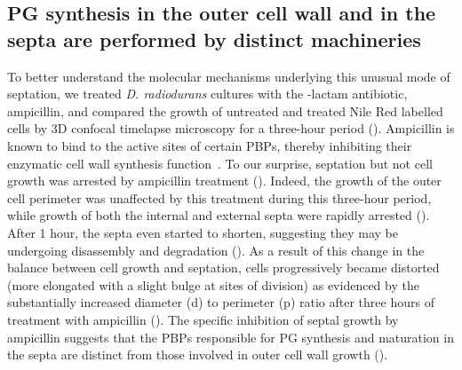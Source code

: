 \FloatBarrier

\subsection{PG synthesis in the outer cell wall and in the septa are performed by distinct machineries}

To better understand the molecular mechanisms underlying this unusual mode of septation, we treated \textit{D. radiodurans} cultures with the \beta-lactam antibiotic, ampicillin, and compared the growth of untreated and treated Nile Red labelled cells by 3D confocal timelapse microscopy for a three-hour period ().
Ampicillin is known to bind to the active sites of certain PBPs, thereby inhibiting their enzymatic cell wall synthesis function~\cite{sauvageGlycosyltransferasesTranspeptidasesPenicillinBinding2016}.
To our surprise, septation but not cell growth was arrested by ampicillin treatment ().
Indeed, the growth of the outer cell perimeter was unaffected by this treatment during this three-hour period, while growth of both the internal and external septa were rapidly arrested ().
After 1 hour, the septa even started to shorten, suggesting they may be undergoing disassembly and degradation ().
As a result of this change in the balance between cell growth and septation, cells progressively became distorted (more elongated with a slight bulge at sites of division) as evidenced by the substantially increased diameter (d) to perimeter (p) ratio after three hours of treatment with ampicillin ().
The specific inhibition of septal growth by ampicillin suggests that the PBPs responsible for PG synthesis and maturation in the septa are distinct from those involved in outer cell wall growth ().

